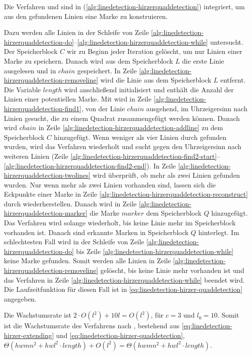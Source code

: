 Die Verfahren  und  sind in 
 (\autoref{alg:linedetection-hirzerquaddetection}) integriert, um aus den gefundenen Linien eine Marke zu konstruieren.

Dazu werden alle Linien in der Schleife von Zeile
 \ref{alg:linedetection-hirzerquaddetection-do}--\ref{alg:linedetection-hirzerquaddetection-while} untersucht. Der
 Speicherblock $C$ wir zu Beginn jeder Iteration gelöscht, um nur Linien einer Marke zu speichern. Danach wird aus dem
 Speicherblock $L$ die erste Linie ausgelesen und in $\mathit{chain}$ gespeichert. In Zeile
 \ref{alg:linedetection-hirzerquaddetection-removeline} wird die Linie aus dem Speicherblock $L$ entfernt. Die Variable
 $\mathit{length}$ wird anschließend initialisiert und enthält die Anzahl der Linien einer potentiellen Marke. Mit
  wird in Zeile \ref{alg:linedetection-hirzerquaddetection-find1}, von der Linie
 $\mathit{chain}$ ausgehend, im Uhrzeigersinn nach Linien gesucht, die zu einem Quadrat zusammengefügt werden können.
 Danach wird $\mathit{chain}$ in Zeile \ref{alg:linedetection-hirzerquaddetection-addline} zu dem Speicherblock $C$
 hinzugefügt. Wenn weniger als vier Linien durch  gefunden wurden, wird das Verfahren
 wiederholt und sucht gegen den Uhrzeigersinn nach weiteren Linien (Zeile
 \ref{alg:linedetection-hirzerquaddetection-find2-start}--\ref{alg:linedetection-hirzerquaddetection-find2-end}). In
 Zeile \ref{alg:linedetection-hirzerquaddetection-twolines} wird überprüft, ob mehr als zwei Linien gefunden wurden.
 Nur wenn mehr als zwei Linien vorhanden sind, lassen sich die Eckpunkte einer Marke in Zeile
 \ref{alg:linedetection-hirzerquaddetection-reconstruct} durch  wiederherstellen. Danach
 wird in Zeile \ref{alg:linedetection-hirzerquaddetection-marker} die Marke $\mathit{marker}$ dem Speicherblock $Q$
 hinzugefügt. Das Verfahren wird solange wiederholt, bis keine Linie mehr im Speicherblock vorhanden ist. Danach sind
 erkannte Marken in Speicherblock $Q$ hinterlegt. Im schlechtesten Fall wird in der Schleife von Zeile
 \ref{alg:linedetection-hirzerquaddetection-do} bis Zeile \ref{alg:linedetection-hirzerquaddetection-while} keine Marke
 gefunden. Somit werden alle Linien in Zeile \ref{alg:linedetection-hirzerquaddetection-removeline} gelöscht, bis keine
 Linie mehr vorhanden ist und das Verfahren in Zeile \ref{alg:linedetection-hirzerquaddetection-while} beendet wird.
 Die Laufzeitfunktion für diesen Fall ist in \autoref{eq:linedetection-hirzer-quaddetection} angegeben.

Die Wachstumsrate ist $2 \cdot O(l^2) + 10l = O(l^2)$, für $c = 3$ und $l_{0} = 10$. Somit ist die Wachstumsrate des
 Verfahrens nach \citeauthor{hirzer08}, bestehend aus \autoref{eq:linedetection-hirzer-extending} und
 \autoref{eq:linedetection-hirzer-quaddetection},
 $\Theta(hwmn^2 + hwl^2\cdot\mathit{length}) + O(l^2) = \Theta(hwmn^2 + hwl^2\cdot\mathit{length})$.
